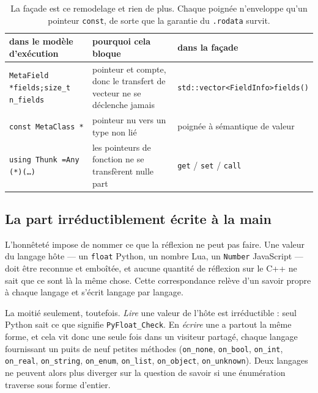 \documentclass[11pt,a4paper]{article}
\newcommand{\code}[1]{\texttt{\small #1}}
\begin{document}
\begin{table}[h]
\centering\footnotesize
\begin{tabular}{@{}p{}p{}p{}@{}}
\toprule
dans le modèle d'exécution & pourquoi cela bloque & dans la façade \\
\midrule
\code{MetaField *fields;}\newline\code{size\_t n\_fields} & pointeur et compte, donc le transfert de vecteur ne se déclenche jamais & \code{std::vector<FieldInfo>}\newline\code{fields()} \\[2pt]
\code{const MetaClass *} & pointeur nu vers un type non lié & poignée à sémantique de valeur \\[2pt]
\code{using Thunk =}\newline\code{Any (*)(\dots)} & les pointeurs de fonction ne se transfèrent nulle part & \code{get} / \code{set} / \code{call} \\
\bottomrule
\end{tabular}
\caption{La façade est ce remodelage et rien de plus. Chaque poignée n'enveloppe
qu'un pointeur \code{const}, de sorte que la garantie du \code{.rodata} survit.}
\label{tab:facade}
\end{table}

\subsection{La part irréductiblement écrite à la main}

L'honnêteté impose de nommer ce que la réflexion ne peut pas faire. Une valeur du
langage hôte --- un \code{float} Python, un nombre Lua, un \code{Number}
JavaScript --- doit être reconnue et emboîtée, et aucune quantité de réflexion
sur le C++ ne sait que ce sont là la même chose. Cette correspondance relève d'un
savoir propre à chaque langage et s'écrit langage par langage.

La moitié seulement, toutefois. \emph{Lire} une valeur de l'hôte est
irréductible : seul Python sait ce que signifie \code{PyFloat\_Check}. En
\emph{écrire} une a partout la même forme, et cela vit donc une seule fois dans
un visiteur partagé, chaque langage fournissant un puits de neuf petites méthodes
(\code{on\_none}, \code{on\_bool}, \code{on\_int}, \code{on\_real},
\code{on\_string}, \code{on\_enum}, \code{on\_list}, \code{on\_object},
\code{on\_unknown}). Deux langages ne peuvent alors plus diverger sur la question
de savoir si une énumération traverse sous forme d'entier.
\end{document}
